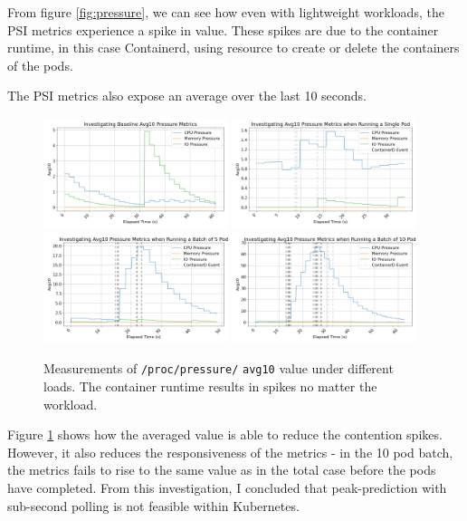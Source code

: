 From figure \ref{fig:pressure}, we can see how even with lightweight workloads,
the PSI metrics experience a spike in value. These spikes are due to the
container runtime, in this case Containerd, using resource to create or delete
the containers of the pods.

The PSI metrics also expose an average over the last 10 seconds.
\begin{figure}[htbp!]
    \centering
    \includegraphics[width=0.48\textwidth]{images/avg-pressure-baseline.png}
    \includegraphics[width=0.48\textwidth]{images/avg-pressure-single.png} \\
    \includegraphics[width=0.48\textwidth]{images/avg-pressure-smallbatch.png}
    \includegraphics[width=0.48\textwidth]{images/avg-pressure-bigbatch.png}
    \caption{Measurements of \texttt{/proc/pressure/} \texttt{avg10} value
    under different loads. The container runtime results in spikes no matter the
    workload.} \label{fig:pressure-avg}
\end{figure}
Figure \ref{fig:pressure-avg} shows how the averaged value is able to reduce the
contention spikes. However, it also reduces the responsiveness of the metrics -
in the 10 pod batch, the metrics fails to rise to the same value as in the
total case before the pods have completed. From this investigation, I concluded
that peak-prediction with sub-second polling is not feasible within Kubernetes.

